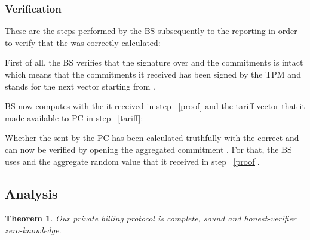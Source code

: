 \documentclass[english]{llncs}
\newtheorem{thm}{Theorem}
\begin{document}
\subsubsection{Verification}
\label{verification}
These are the steps  performed by the BS subsequently  to the reporting in order to verify that the  was correctly calculated:

First of all, the BS verifies that the signature  over  and the commitments is intact which means that the commitments it received has been signed by the TPM and stands for the next vector  starting from .

BS now computes  with the  it received in step ~\ref{proof} and the tariff vector  that it made available to PC in step ~\ref{tariff}: 

Whether the  sent by the PC has been calculated truthfully with the correct  and  can now be verified by opening the aggregated commitment . For that, the BS uses  and the aggregate random value  that it received in step ~\ref{proof}.


\subsection{Analysis}
\label{analysis}
\begin{thm}
Our private billing protocol is complete, sound and honest-verifier zero-knowledge.
\end{thm}
\end{document}
